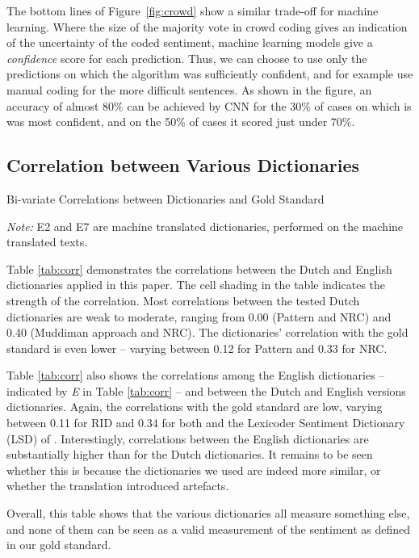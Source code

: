 The bottom lines of Figure~\ref{fig:crowd} show a similar trade-off for machine learning. 
Where the size of the majority vote in crowd coding gives an indication of the uncertainty of the coded sentiment,
machine learning models give a \emph{confidence} score for each prediction.
Thus, we can choose to use only the predictions on which the algorithm was sufficiently confident, 
and for example use manual coding for the more difficult sentences. 
As shown in the figure, an accuracy of almost $80\%$ can be achieved by CNN for the 30\% of cases on which is was most confident,
and on the 50\% of cases it scored just under $70\%$.

\subsection{Correlation between Various Dictionaries}
\begin{table}[ht!]
  \caption{Bi-variate Correlations between Dictionaries and Gold Standard}\label{tab:corr}

\emph{Note:} E2 and E7 are machine translated dictionaries, performed on the machine translated texts.
\end{table}

\noindent Table \ref{tab:corr} demonstrates the correlations between the Dutch and English dictionaries applied in this paper. 
The cell shading in the table indicates the strength of the correlation.
Most correlations between the tested Dutch dictionaries are weak to moderate, ranging from 0.00 (Pattern and NRC) and 0.40 (Muddiman approach and NRC).
The dictionaries' correlation with the gold standard is even lower -- varying between 0.12 for Pattern and 0.33 for NRC. 

Table \ref{tab:corr} also shows the correlations among the English dictionaries -- indicated by \emph{E} in Table \ref{tab:corr} -- and between the Dutch and English versions dictionaries.
Again, the correlations with the gold standard are low, varying between 0.11 for RID \citep{martindale1992, martindale1975} and 0.34 for both \cite{hu2004} and the Lexicoder Sentiment Dictionary (LSD) of \cite{lexicoder,young12}.
Interestingly, correlations between the English dictionaries are substantially higher than for the Dutch dictionaries.
It remains to be seen whether this is because the dictionaries we used are indeed more similar, or whether the translation introduced artefacts.

Overall, this table shows that the various dictionaries all measure something else, and none of them can be seen as a valid measurement of the sentiment as defined in our gold standard. 

